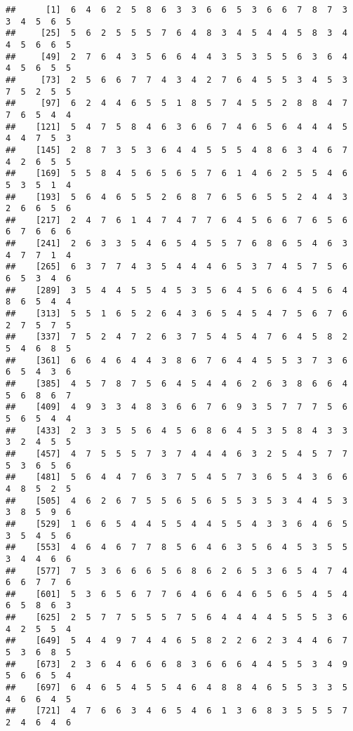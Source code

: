 \documentclass[
]{book}
\begin{document}
\begin{verbatim}
##      [1]  6  4  6  2  5  8  6  3  3  6  6  5  3  6  6  7  8  7  3  3  4  5  6  5
##     [25]  5  6  2  5  5  5  7  6  4  8  3  4  5  4  4  5  8  3  4  4  5  6  6  5
##     [49]  2  7  6  4  3  5  6  6  4  4  3  5  3  5  5  6  3  6  4  4  5  6  5  5
##     [73]  2  5  6  6  7  7  4  3  4  2  7  6  4  5  5  3  4  5  3  7  5  2  5  5
##     [97]  6  2  4  4  6  5  5  1  8  5  7  4  5  5  2  8  8  4  7  7  6  5  4  4
##    [121]  5  4  7  5  8  4  6  3  6  6  7  4  6  5  6  4  4  4  5  4  4  7  5  3
##    [145]  2  8  7  3  5  3  6  4  4  5  5  5  4  8  6  3  4  6  7  4  2  6  5  5
##    [169]  5  5  8  4  5  6  5  6  5  7  6  1  4  6  2  5  5  4  6  5  3  5  1  4
##    [193]  5  6  4  6  5  5  2  6  8  7  6  5  6  5  5  2  4  4  3  2  6  6  5  6
##    [217]  2  4  7  6  1  4  7  4  7  7  6  4  5  6  6  7  6  5  6  6  7  6  6  6
##    [241]  2  6  3  3  5  4  6  5  4  5  5  7  6  8  6  5  4  6  3  4  7  7  1  4
##    [265]  6  3  7  7  4  3  5  4  4  4  6  5  3  7  4  5  7  5  6  6  5  3  4  6
##    [289]  3  5  4  4  5  5  4  5  3  5  6  4  5  6  6  4  5  6  4  8  6  5  4  4
##    [313]  5  5  1  6  5  2  6  4  3  6  5  4  5  4  7  5  6  7  6  2  7  5  7  5
##    [337]  7  5  2  4  7  2  6  3  7  5  4  5  4  7  6  4  5  8  2  5  4  6  8  5
##    [361]  6  6  4  6  4  4  3  8  6  7  6  4  4  5  5  3  7  3  6  6  5  4  3  6
##    [385]  4  5  7  8  7  5  6  4  5  4  4  6  2  6  3  8  6  6  4  5  6  8  6  7
##    [409]  4  9  3  3  4  8  3  6  6  7  6  9  3  5  7  7  7  5  6  5  6  5  4  4
##    [433]  2  3  3  5  5  6  4  5  6  8  6  4  5  3  5  8  4  3  3  3  2  4  5  5
##    [457]  4  7  5  5  5  7  3  7  4  4  4  6  3  2  5  4  5  7  7  5  3  6  5  6
##    [481]  5  6  4  4  7  6  3  7  5  4  5  7  3  6  5  4  3  6  6  4  8  5  2  5
##    [505]  4  6  2  6  7  5  5  6  5  6  5  5  3  5  3  4  4  5  3  3  8  5  9  6
##    [529]  1  6  6  5  4  4  5  5  4  4  5  5  4  3  3  6  4  6  5  3  5  4  5  6
##    [553]  4  6  4  6  7  7  8  5  6  4  6  3  5  6  4  5  3  5  5  3  4  4  6  6
##    [577]  7  5  3  6  6  6  5  6  8  6  2  6  5  3  6  5  4  7  4  6  6  7  7  6
##    [601]  5  3  6  5  6  7  7  6  4  6  6  4  6  5  6  5  4  5  4  6  5  8  6  3
##    [625]  2  5  7  7  5  5  5  7  5  6  4  4  4  4  5  5  5  3  6  4  2  5  5  4
##    [649]  5  4  4  9  7  4  4  6  5  8  2  2  6  2  3  4  4  6  7  5  3  6  8  5
##    [673]  2  3  6  4  6  6  6  8  3  6  6  6  4  4  5  5  3  4  9  5  6  6  5  4
##    [697]  6  4  6  5  4  5  5  4  6  4  8  8  4  6  5  5  3  3  5  4  6  6  4  5
##    [721]  4  7  6  6  3  4  6  5  4  6  1  3  6  8  3  5  5  5  7  2  4  6  4  6

\end{verbatim}
\end{document}
